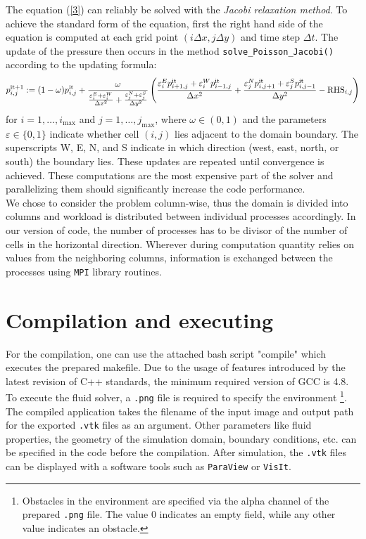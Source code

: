 \documentclass[a4paper, 10pt]{article}
\begin{document}
The equation (\ref{3}) can reliably be solved with the \textit{Jacobi relaxation method}. To achieve the standard form of the equation, first the right hand side of the equation is computed at each grid point $ (i \Delta x, j \Delta y) $ and time step $ \Delta t $. The update of the pressure then occurs in the method \texttt{solve\_Poisson\_Jacobi()} according to the updating formula:
\begin{equation*}
p_{i,j}^{\textnormal{it}+1} := (1-\omega)p_{i,j}^{\textnormal{it}} + \frac{\omega}{\frac{\varepsilon_i^E + \varepsilon_i^W}{\Delta x^2} + \frac{\varepsilon_j^N + \varepsilon_j^S}{\Delta y^2}} \left( \frac{\varepsilon_i^Ep_{i+1,j}^{\textmd{it}} + \varepsilon_i^Wp_{i-1,j}^{\textmd{it}}}{\Delta x^2}+\frac{\varepsilon_j^N p_{i,j + 1}^{\textmd{it}} + \varepsilon_j^S p_{i, j-1}^{\textmd{it}}}{\Delta y^2} - \mathrm{RHS}_{i,j}\right)
\end{equation*}
for $ i = 1 , \dots, i_{\max} $ and $ j = 1, \dots, j_{\max} $, where $\omega\in(0, 1)$ and the parameters $ \varepsilon \in \{0, 1\} $ indicate whether cell $ (i, j) $ lies adjacent to the domain boundary. The superscripts
W, E, N, and S indicate in which direction (west, east, north, or south) the boundary lies. These updates are repeated until convergence is achieved. These computations are the most expensive part of the solver and parallelizing them should significantly increase the code performance.\\

We chose to consider the problem column-wise, thus the domain is divided into columns and workload is distributed between individual processes accordingly. In our version of code, the number of processes has to be divisor of the number of cells in the horizontal direction. Wherever during computation quantity relies on values from the neighboring columns, information is exchanged between the processes using \texttt{MPI} library routines.

\section{Compilation and executing}

For the compilation, one can use the attached bash script "compile" which executes the prepared makefile. Due to the usage of features introduced by the latest revision of C++ standards, the minimum required version of GCC is 4.8.\\

To execute the fluid solver, a \texttt{.png} file is required to specify the environment \footnote{Obstacles in the environment are specified via the alpha channel of the prepared \texttt{.png} file. The value 0 indicates an empty field, while any other value indicates an obstacle.}. The compiled application takes the filename of the input image and output path for the exported \texttt{.vtk} files as an argument. Other parameters like fluid properties, the geometry of the simulation domain, boundary conditions, etc. can be specified in the code before the compilation. After simulation, the \texttt{.vtk} files can be displayed with a software tools such as \texttt{ParaView} or \texttt{VisIt}. \\
\end{document}
